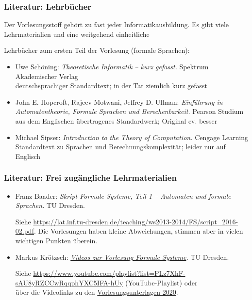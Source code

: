 \documentclass[aspectratio=1610,onlymath]{beamer}
\begin{document}

\begin{frame}\frametitle{Literatur: Lehrbücher}

Der Vorlesungsstoff gehört zu fast jeder Informatikausbildung. Es gibt viele
Lehrmaterialien und eine weitgehend einheitliche 
\bigskip

Lehrbücher zum ersten Teil der Vorlesung (formale Sprachen):

\begin{itemize}
\item Uwe Schöning: \emph{Theoretische Informatik -- kurz gefasst.} Spektrum Akademischer Verlag\\
{\footnotesize\textcolor{devilscss}{deutschsprachiger Standardtext; in der Tat ziemlich kurz gefasst}}
%
\item John E. Hopcroft, Rajeev Motwani, Jeffrey D. Ullman: \emph{Einführung in Automatentheorie, Formale Sprachen und Berechenbarkeit.} Pearson Studium\\
{\footnotesize\textcolor{devilscss}{aus dem Englischen übertragenes Standardwerk; Original ev. besser}}
%
\item Michael Sipser: \emph{Introduction to the Theory of Computation.}  Cengage Learning\\
{\footnotesize\textcolor{devilscss}{Standardtext zu Sprachen und Berechnungskomplexität; leider nur auf Englisch}}
\end{itemize}

\end{frame}

\begin{frame}\frametitle{Literatur: Frei zugängliche Lehrmaterialien}

\begin{itemize}
\item Franz Baader: \emph{Skript Formale Systeme, Teil 1 -- Automaten und formale Sprachen.} TU Dresden.\\[0.5ex]
{\tiny Siehe \url{https://lat.inf.tu-dresden.de/teaching/ws2013-2014/FS/script_2016-02.pdf}. Die Vorlesungen haben kleine Abweichungen, stimmen aber in vielen wichtigen Punkten überein.

}
\item Markus Krötzsch: \emph{\href{https://www.youtube.com/playlist?list=PLz7XhF-sAU8yRZCCwRqqphYXC5IFA-hUy}{Videos zur Vorlesung Formale Systeme}.} TU Dresden.\\[0.5ex]
{\tiny Siehe \url{https://www.youtube.com/playlist?list=PLz7XhF-sAU8yRZCCwRqqphYXC5IFA-hUy} (YouTube-Playlist) oder\\ über die  Videolinks zu den \href{https://iccl.inf.tu-dresden.de/web/FS2020}{Vorlesungsunterlagen 2020}.

}
\end{itemize}

\end{frame}
\end{document}
